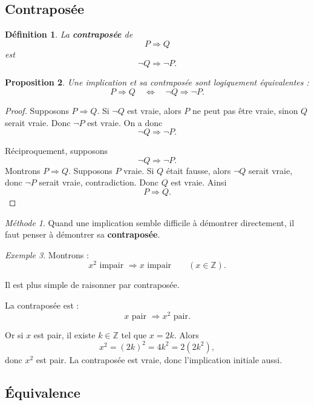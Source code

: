 \documentclass[11pt,a4paper]{article}
\newtheorem{definition}{Définition}[section]
\newtheorem{proposition}[definition]{Proposition}
\theoremstyle{remark}
\newtheorem{exemple}[definition]{Exemple}
\newtheorem*{methode}{Méthode}
\newcommand{\Z}{\mathbb{Z}}
\begin{document}
\subsection{Contraposée}

\begin{definition}
La \textbf{contraposée} de
\[
P\Longrightarrow Q
\]
est
\[
\neg Q \Longrightarrow \neg P.
\]
\end{definition}

\begin{proposition}
Une implication et sa contraposée sont logiquement équivalentes :
\[
P\Longrightarrow Q
\quad \Longleftrightarrow \quad
\neg Q \Longrightarrow \neg P.
\]
\end{proposition}

\begin{proof}
Supposons \(P\Longrightarrow Q\). Si \(\neg Q\) est vraie, alors \(P\) ne peut pas être vraie, sinon \(Q\) serait vraie. Donc \(\neg P\) est vraie. On a donc
\[
\neg Q \Longrightarrow \neg P.
\]

Réciproquement, supposons
\[
\neg Q \Longrightarrow \neg P.
\]
Montrons \(P\Longrightarrow Q\). Supposons \(P\) vraie. Si \(Q\) était fausse, alors \(\neg Q\) serait vraie, donc \(\neg P\) serait vraie, contradiction. Donc \(Q\) est vraie. Ainsi
\[
P\Longrightarrow Q.
\]
\end{proof}

\begin{methode}
Quand une implication semble difficile à démontrer directement, il faut penser à démontrer sa \textbf{contraposée}.
\end{methode}

\begin{exemple}
Montrons :
\[
x^2 \text{ impair } \Longrightarrow x \text{ impair}
\qquad (x\in \Z).
\]

Il est plus simple de raisonner par contraposée.

La contraposée est :
\[
x \text{ pair } \Longrightarrow x^2 \text{ pair}.
\]

Or si \(x\) est pair, il existe \(k\in\Z\) tel que \(x=2k\). Alors
\[
x^2=(2k)^2=4k^2=2(2k^2),
\]
donc \(x^2\) est pair. La contraposée est vraie, donc l’implication initiale aussi.
\end{exemple}

\subsection{Équivalence}
\end{document}
